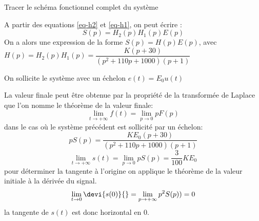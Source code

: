 \question{}
Tracer le schéma fonctionnel complet du système
\begin{center}
\end{center}

\question{}
A partir des equations \ref{eq-h2} et \ref{eq-h1}, on peut écrire :
$$
S(p) = H_2(p) H_1(p) E(p)
$$
On a alors une expression de la forme $S(p) =H(p) E(p)$,
avec $H(p)=H_2(p) H_1(p)=\dfrac{K(p+30)}{(p^2+110p+1000)(p+1)}$
\begin{center}
\end{center}
On sollicite le système avec un échelon $e(t)=E_0 u(t)$

\question{}
La valeur finale peut être obtenue par la propriété de la transformée 
de Laplace que l'on nomme le théorème de la valeur finale:
$$
\lim\limits_{t \rightarrow +\infty} f(t) = \lim\limits_{p \rightarrow 0} pF(p)
$$
dans le cas où le système précédent est sollicité par un échelon:
$$
pS(p)=\dfrac{KE_0(p+30)}{(p^2+110p+1000)(p+1)}
$$
$$
\lim\limits_{t \rightarrow +\infty} s(t) = \lim\limits_{p \rightarrow 0} pS(p) 
                                         = \dfrac{3}{100}KE_0
$$
pour déterminer la tangente à l'origine on applique le théorème de la valeur 
initiale à la dérivée du signal.
$$
\lim\limits_{t \rightarrow 0} \devi{s(0)}{} = 
\lim\limits_{p \rightarrow +\infty} p^2S(p))= 0
$$
la tangente de $s(t)$ est donc horizontal en 0.



